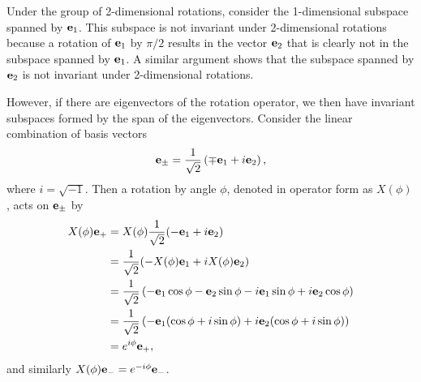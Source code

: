 \begin{example}
    Under the group of 2-dimensional rotations, consider the 1-dimensional subspace spanned by $\mathbf{e}_1$. This subspace is not invariant under 2-dimensional rotations because a rotation of $\mathbf{e}_1$ by $\pi/2$ results in the vector $\mathbf{e}_2$ that is clearly not in the subspace spanned by $\mathbf{e}_1$. A similar argument shows that the subspace spanned by $\mathbf{e}_2$ is not invariant under 2-dimensional rotations.

    However, if there are eigenvectors of the rotation operator, we then have invariant subspaces formed by the span of the eigenvectors.
    Consider the linear combination of basis vectors
    \begin{equation*}
        \mathbf{e}_\pm = \frac{1}{\sqrt{2}}\left( \mp\mathbf{e}_1 + i\mathbf{e}_2 \right),
    \end{equation*}
    where $i = \sqrt{-1}$. Then a rotation by angle $\phi$, denoted in operator form as $X(\phi)$, acts on $\mathbf{e}_\pm$ by
    \begin{align*}
        X(\phi)\mathbf{e}_+ &= X(\phi)\frac{1}{\sqrt{2}}(-\mathbf{e}_1 + i\mathbf{e}_2) \\
        &= \frac{1}{\sqrt{2}}(-X(\phi)\mathbf{e}_1 + iX(\phi)\mathbf{e}_2) \\
        &= \frac{1}{\sqrt{2}}\left( -\mathbf{e}_1\cos\phi - \mathbf{e}_2\sin\phi -i\mathbf{e}_1\sin\phi + i\mathbf{e}_2\cos\phi \right) \\
        &= \frac{1}{\sqrt{2}}\left( -\mathbf{e}_1(\cos\phi + i\sin\phi) + i\mathbf{e}_2(\cos\phi+i\sin\phi) \right) \\
        &= e^{i\phi}\mathbf{e}_+,
    \end{align*}
    and similarly $X(\phi)\mathbf{e}_- = e^{-i\phi}\mathbf{e}_-$.


\end{example}
